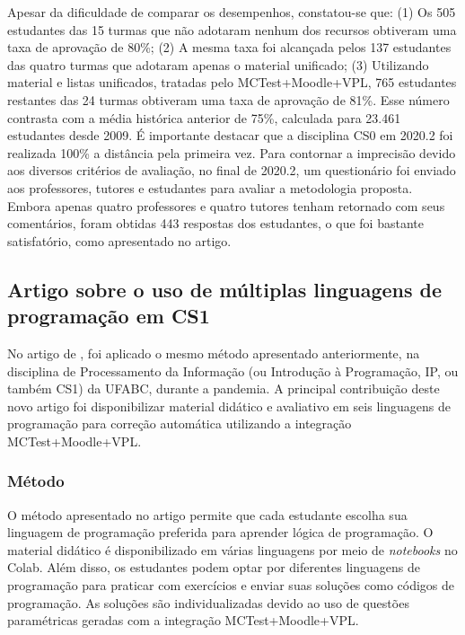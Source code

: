 Apesar da dificuldade de comparar os desempenhos, constatou-se que:
(1) Os 505 estudantes das 15 turmas que não adotaram nenhum dos recursos obtiveram uma taxa de aprovação de 80\%;
(2) A mesma taxa foi alcançada pelos 137 estudantes das quatro turmas que adotaram apenas o material unificado;
(3) Utilizando material e listas unificados, tratadas pelo MCTest+Moodle+VPL, 765 estudantes restantes das 24 turmas obtiveram uma taxa de aprovação de 81\%. Esse número contrasta com a média histórica anterior de 75\%, calculada para 23.461 estudantes desde 2009. É importante destacar que a disciplina CS0 em 2020.2 foi realizada 100\% a distância pela primeira vez.
Para contornar a imprecisão devido aos diversos critérios de avaliação, no final de 2020.2, um questionário foi enviado aos professores, tutores e estudantes para avaliar a metodologia proposta. Embora apenas quatro professores e quatro tutores tenham retornado com seus comentários, foram obtidas 443 respostas dos estudantes, o que foi bastante satisfatório, como apresentado no artigo.

\subsection{Artigo sobre o uso de múltiplas linguagens de programação em CS1}

No artigo de , foi aplicado o mesmo método apresentado anteriormente, na disciplina de Processamento da Informação (ou Introdução à Programação, IP, ou também CS1) da UFABC, durante a pandemia. A principal contribuição deste novo artigo foi disponibilizar material didático e avaliativo em seis linguagens de programação para correção automática utilizando a integração MCTest+Moodle+VPL. 

\subsubsection{Método}

O método apresentado no artigo permite que cada estudante escolha sua linguagem de programação preferida para aprender lógica de programação. O material didático é disponibilizado em várias linguagens por meio de \textit{notebooks} no Colab. Além disso, os estudantes podem optar por diferentes linguagens de programação para praticar com exercícios e enviar suas soluções como códigos de programação. As soluções são individualizadas devido ao uso de questões paramétricas geradas com a integração MCTest+Moodle+VPL.

